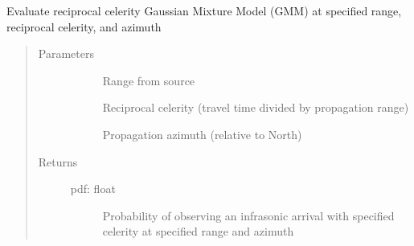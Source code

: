 \documentclass[letterpaper,10pt,english]{sphinxmanual}
\begin{document}
\begin{fulllineitems}
\begin{fulllineitems}
\begin{quote}
\begin{description}
\end{description}\end{quote}

\end{fulllineitems}


\begin{fulllineitems}
\label{\detokenize{stochprop.propagation:stochprop.propagation.PathGeometryModel.eval_rcel_gmm}}
Evaluate reciprocal celerity Gaussian Mixture Model (GMM)
at specified range, reciprocal celerity, and azimuth
\begin{quote}\begin{description}
\item[{Parameters}] \leavevmode\begin{description}
\item[{}] \leavevmode
Range from source

\item[{}] \leavevmode
Reciprocal celerity (travel time divided by propagation range)

\item[{}] \leavevmode
Propagation azimuth (relative to North)

\end{description}

\item[{Returns}] \leavevmode\begin{description}
\item[{pdf: float}] \leavevmode
Probability of observing an infrasonic arrival with specified celerity at specified range and azimuth

\end{description}

\end{description}\end{quote}

\end{fulllineitems}



\end{fulllineitems}
\end{document}
